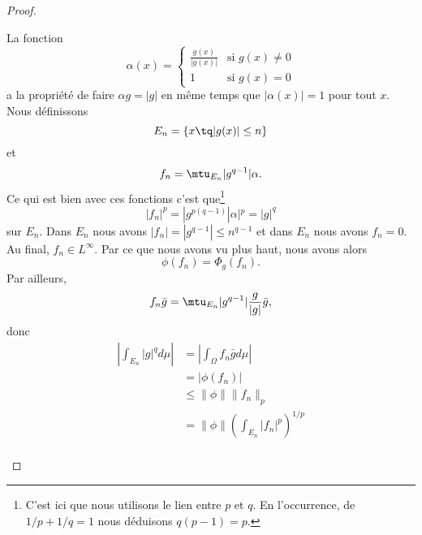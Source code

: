 \begin{proof}
\begin{subproof}
    La fonction
    \begin{equation}
        \alpha(x)=\begin{cases}
            \frac{ g(x) }{ | g(x) | } & \text{si } g(x)\neq 0 \\
            1                         & \text{si } g(x)=0
        \end{cases}
    \end{equation}
    a la propriété de faire \( \alpha g=| g |\) en même temps que \( | \alpha(x) |=1\) pour tout \( x\). Nous définissons
    \begin{equation}
        E_n=\{ x\tq | g(x) |\leq n \}
    \end{equation}
    et
    \begin{equation}
        f_n=\mtu_{E_n}| g^{q-1} |\alpha.
    \end{equation}
    Ce qui est bien avec ces fonctions c'est que\footnote{C'est ici que nous utilisons le lien entre \( p\) et \( q\). En l'occurrence, de \( 1/p+1/q=1\) nous déduisons \( q(p-1)=p\).}
    \begin{equation}
        | f_n |^p=| g^{p(q-1)} | \alpha |^p=| g |^q
    \end{equation}
    sur \( E_n\). Dans \( E_n\) nous avons \( | f_n |=| g^{q-1} |\leq n^{q-1}\) et dans \( E_n\) nous avons \( f_n=0\). Au final, \( f_n\in L^{\infty}\). Par ce que nous avons vu plus haut, nous avons alors
    \begin{equation}
        \phi(f_n)=\Phi_g(f_n).
    \end{equation}
    Par ailleurs,
    \begin{equation}
        f_n\bar g=\mtu_{E_n}| g^{q-1} |\frac{ g }{ | g | }\bar g,
    \end{equation}
    donc
    \begin{subequations}
        \begin{align}
            \left|\int_{E_n}| g |^qd\mu\right| & =|\int_{\Omega}f_n\bar gd\mu|                       \\
                                               & =|\phi(f_n)|                                        \\
                                               & \leq \| \phi \|\| f_n \|_p                          \\
                                               & =\| \phi \|\left( \int_{E_n}| f_n |^p \right)^{1/p} \\

\end{align}
\end{subequations}
\end{subproof}
\end{proof}

